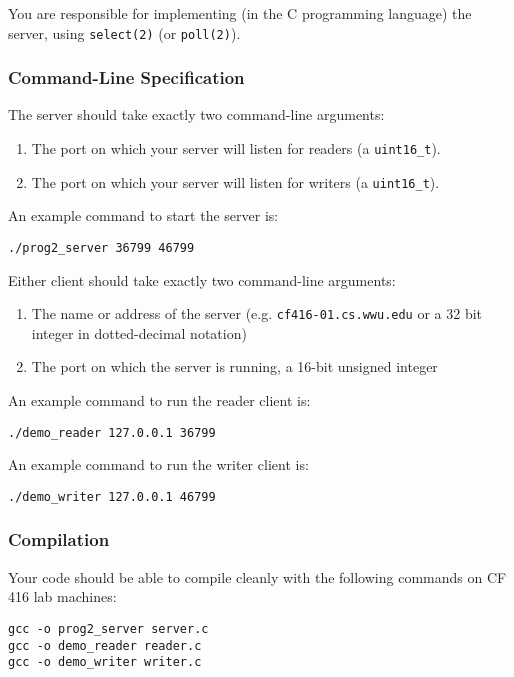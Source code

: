 \documentclass[12pt]{article}
\begin{document}
You are responsible for implementing (in the C programming language) the server, using \verb|select(2)| (or \verb|poll(2)|). 


\subsubsection*{Command-Line Specification}

The server should take exactly two command-line arguments:
\begin{enumerate}
    \item \setlength{\parskip}{-3pt} The port on which your server will listen for readers (a \verb|uint16_t|).
	\item  The port on which your server will listen for writers (a \verb|uint16_t|).
\end{enumerate}
An example command to start the server is:
\begin{verbatim}
./prog2_server 36799 46799
\end{verbatim}
Either client should take exactly two command-line arguments:
\begin{enumerate}
	\item \setlength{\parskip}{-3pt} The name or address of the server (e.g. \verb|cf416-01.cs.wwu.edu| or a 32 bit integer in dotted-decimal notation)
	\item The port on which the server is running, a 16-bit unsigned integer
\end{enumerate}
An example command to run the reader client is:
\begin{verbatim}
./demo_reader 127.0.0.1 36799
\end{verbatim}
An example command to run the writer client is:
\begin{verbatim}
./demo_writer 127.0.0.1 46799
\end{verbatim}

\subsubsection*{Compilation}
Your code should be able to compile cleanly with the following commands on CF 416 lab machines:
\begin{verbatim}
gcc -o prog2_server server.c
gcc -o demo_reader reader.c
gcc -o demo_writer writer.c
\end{verbatim}
\end{document}
